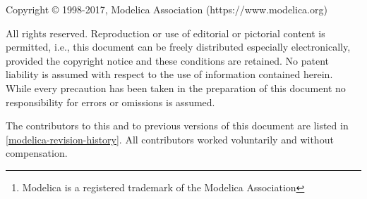 \documentclass[../MLS.tex]{subfiles}
\begin{document}
\hypersetup{pageanchor=false,bookmarksdepth=2,destlabel=true,bookmarksopenlevel=0}
\begin{abstract}
\begin{center}
\texttt{[image: image1]}
\end{center}
This document defines the Modelica\footnote{Modelica is a registered
  trademark of the Modelica Association} language, version 3.4, which is
developed by the Modelica Association, a non-profit organization with
seat in Linköping, Sweden. Modelica is a freely available,
object-oriented language for modeling of large, complex, and
heterogeneous systems. It is suited for multi-domain modeling, for
example, mechatronic models in robotics, automotive and aerospace
applications involving mechanical, electrical, hydraulic control and
state machine subsystems, process oriented applications and generation
and distribution of electric power. Models in Modelica are
mathematically described by differential, algebraic and discrete
equations. No particular variable needs to be solved for manually. A
Modelica tool will have enough information to decide that automatically.
Modelica is designed such that available, specialized algorithms can be
utilized to enable efficient handling of large models having more than
one hundred thousand equations. Modelica is suited and used for
hardware-in-the-loop simulations and for embedded control systems. More
information is available at
\href{http://www.modelica.org/}{http://www.Modelica.org/}
\end{abstract}
\hypersetup{pageanchor=true}
Copyright © 1998-2017, Modelica Association (https://www.modelica.org)

All rights reserved. Reproduction or use of editorial or pictorial
content is permitted, i.e., this document can be freely distributed
especially electronically, provided the copyright notice and these
conditions are retained. No patent liability is assumed with respect to
the use of information contained herein. While every precaution has been
taken in the preparation of this document no responsibility for errors
or omissions is assumed.

The contributors to this and to previous versions of this document are
listed in \autoref{modelica-revision-history}. All contributors worked voluntarily and without
compensation.

\tableofcontents
\end{document}
